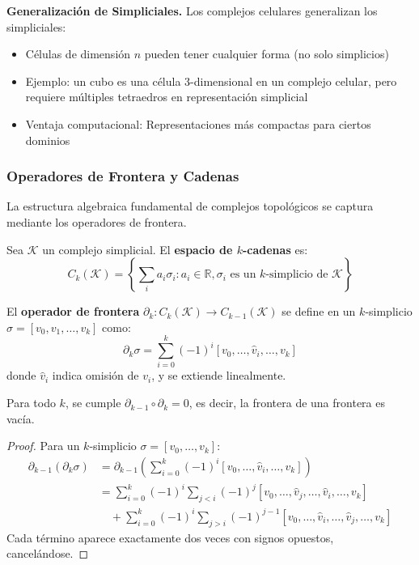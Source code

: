 \textbf{Generalización de Simpliciales.}\label{rem:celular_vs_simplicial} Los complejos celulares generalizan los simpliciales:
\begin{itemize}
    \item Células de dimensión $n$ pueden tener cualquier forma (no solo simplicios)
    \item Ejemplo: un cubo es una célula 3-dimensional en un complejo celular, pero requiere múltiples tetraedros en representación simplicial
    \item Ventaja computacional: Representaciones más compactas para ciertos dominios
\end{itemize}

\subsubsection{Operadores de Frontera y Cadenas}

La estructura algebraica fundamental de complejos topológicos se captura mediante los operadores de frontera.

\begin{definition}\label{def:cadenas_frontera}
Sea $\mathcal{K}$ un complejo simplicial. El \textbf{espacio de $k$-cadenas} es:
\[C_k(\mathcal{K}) = \left\{\sum_{i} a_i \sigma_i : a_i \in \mathbb{R}, \sigma_i \text{ es un } k\text{-simplicio de } \mathcal{K}\right\}\]

El \textbf{operador de frontera} $\partial_k: C_k(\mathcal{K}) \to C_{k-1}(\mathcal{K})$ se define en un $k$-simplicio $\sigma = [v_0, v_1, \ldots, v_k]$ como:
\[\partial_k \sigma = \sum_{i=0}^k (-1)^i [v_0, \ldots, \hat{v}_i, \ldots, v_k]\]
donde $\hat{v}_i$ indica omisión de $v_i$, y se extiende linealmente.
\end{definition}

\begin{theorem}[Propiedad Fundamental: $\partial^2 = 0$]\label{thm:partial_squared}
Para todo $k$, se cumple $\partial_{k-1} \circ \partial_k = 0$, es decir, la frontera de una frontera es vacía.
\end{theorem}

\begin{proof}
Para un $k$-simplicio $\sigma = [v_0, \ldots, v_k]$:
\begin{align}
\partial_{k-1}(\partial_k \sigma) &= \partial_{k-1}\left(\sum_{i=0}^k (-1)^i [v_0, \ldots, \hat{v}_i, \ldots, v_k]\right) \\
&= \sum_{i=0}^k (-1)^i \sum_{j<i} (-1)^j [v_0, \ldots, \hat{v}_j, \ldots, \hat{v}_i, \ldots, v_k] \\
&\quad + \sum_{i=0}^k (-1)^i \sum_{j>i} (-1)^{j-1} [v_0, \ldots, \hat{v}_i, \ldots, \hat{v}_j, \ldots, v_k]
\end{align}
Cada término aparece exactamente dos veces con signos opuestos, cancelándose.
\end{proof}

